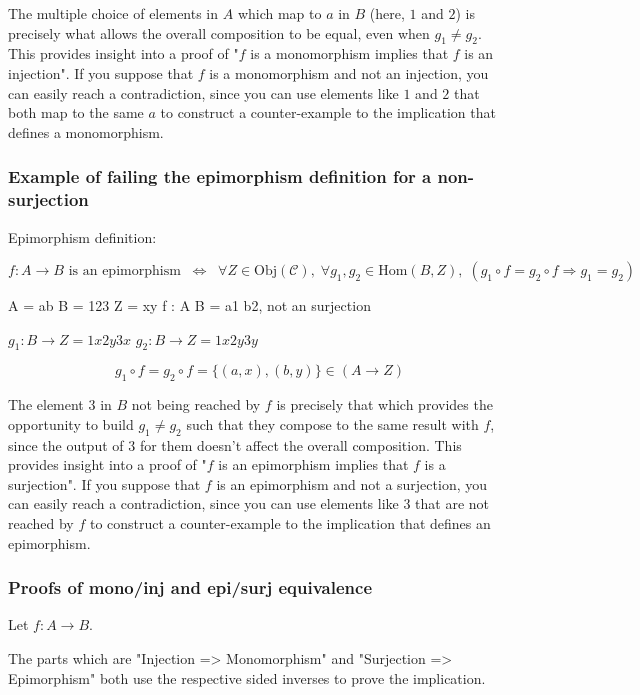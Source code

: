\documentclass[12pt, letterpaper, twoside]{article}
\begin{document}
The multiple choice of elements in $A$ which map to $a$ in $B$ (here, $1$ and $2$) is precisely what allows the overall composition to be equal, even when $g_1 \neq g_2$. This provides insight into a proof of "$f$ is a monomorphism implies that $f$ is an injection". If you suppose that $f$ is a monomorphism and not an injection, you can easily reach a contradiction, since you can use elements like $1$ and $2$ that both map to the same $a$ to construct a counter-example to the implication that defines a monomorphism.


\subsubsection{Example of failing the epimorphism definition for a non-surjection}

Epimorphism definition:

$$
\text{$f : A \to B$ is an epimorphism}
\; \; \Leftrightarrow \; \; 
\forall Z \in \text{Obj}(\mathcal{C}), \;
\forall g_1, g_2 \in \text{Hom}(B, Z), \;
(g_1 \circ f = g_2 \circ f \Rightarrow g_1 = g_2)
$$

A = ab
B = 123
Z = xy
f : A \to B = a1 b2, not an surjection

$g_1 : B \to Z = 1x 2y 3x$
$g_2 : B \to Z = 1x 2y 3y$

$$g_1 \circ f = g_2 \circ f = \{(a, x), (b, y)\} \in (A \to Z)$$

The element $3$ in $B$ not being reached by $f$ is precisely that which provides the opportunity to build $g_1 \neq g_2$ such that they compose to the same result with $f$, since the output of $3$ for them doesn't affect the overall composition. This provides insight into a proof of "$f$ is an epimorphism implies that $f$ is a surjection". If you suppose that $f$ is an epimorphism and not a surjection, you can easily reach a contradiction, since you can use elements like $3$ that are not reached by $f$ to construct a counter-example to the implication that defines an epimorphism.



\subsubsection{Proofs of mono/inj and epi/surj equivalence}

Let $f : A \to B$.

The parts which are "Injection => Monomorphism" and "Surjection => Epimorphism" both use the respective sided inverses to prove the implication.
\end{document}

